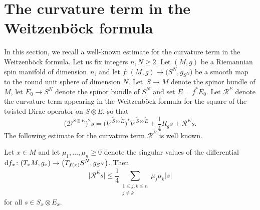 \appendix

\appendix
\section{The curvature term in the Weitzenb\"ock formula}\label{appendix:Weitzen}

In this section, we recall a well-known estimate for the curvature term in the Weitzenb\"ock formula. Let us fix integers $n,N \geq 2$. Let $(M,g)$ be a Riemannian spin manifold of dimension~$n$, and let $f\colon (M,g) \to \big(S^N,g_{S^N}\big)$ be a smooth map to the round unit sphere of dimension $N$. Let~${S \to M}$ denote the spinor bundle of $M$, let $E_0 \to S^N$ denote the spinor bundle of $S^N$ and set $E = f^* E_0$. Let $\mathcal{R}^E$ denote the curvature term appearing in the Weitzenb\"ock formula for the square of the twisted Dirac operator on $S \otimes E$, so that
\[
\big(\mathcal{D}^{S \otimes E }\big)^2 s = \big(\nabla^{\tilde{S} \otimes \tilde{E}}\big)^*\nabla^{\tilde{S} \otimes \tilde{E}} + \frac{1}{4} R_g s + \mathcal{R}^{E} s.
\]
The following estimate for the curvature term $\mathcal{R}^E$ is well known.

\begin{Proposition}
\label{curvature.term}
Let $x \in M$ and let $ \mu_1,\hdots,\mu_n \geq 0$ denote the singular values of the differential ${\rm d}f_x\colon (T_x M , g_x) \to \big(T_{f(x)} S^N,g_{S^N}\big)$. Then
\[
 \big|\mathcal{R}^E s\big| \leq \frac{1}{4} \sum_{\substack{1 \leq j,k \leq n\\ j \neq k}} \mu_j \mu_k |s|
\]
for all $s \in S_x \otimes E_x$.
\end{Proposition}

